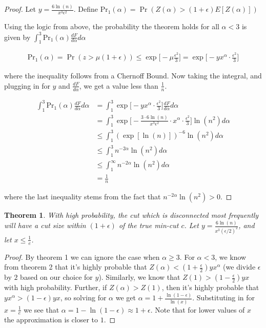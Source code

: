 \documentclass{article}
\newtheorem{theorem}{Theorem}
\begin{document}
\begin{proof}
Let $y = \frac{6 \ln(n)}{x^3 \epsilon^2}$. Define $\text{Pr}_1(\alpha) = \Pr(Z(\alpha) > (1+\epsilon) E[Z(\alpha)])$

Using the logic from above, the probability the theorem holds for all $\alpha < 3$ is given by $\int_{1}^3 \text{Pr}_1(\alpha) \frac{dF}{d \alpha} d\alpha$

\begin{align*}
\text{Pr}_1(\alpha) = \Pr(z > \mu(1 + \epsilon)) \leq \exp \bigg[ -\mu \frac{\epsilon^2}{3}\bigg] = \exp \bigg[-y x^\alpha \cdot \frac{\epsilon^2}{3} \bigg]
\end{align*}

where the inequality follows from a Chernoff Bound. Now taking the integral, and plugging in for $y$ and $\frac{dF}{d \alpha}$, we get a value less than $\frac{1}{n}$.

\begin{align*}
\int_{1}^3 \text{Pr}_1(\alpha) \frac{dF}{d \alpha} d\alpha &= \int_{1}^3 \exp \bigg[-y x^\alpha \cdot \frac{\epsilon^2}{3} \bigg] \frac{dF}{d \alpha} d\alpha \\
&= \int_{1}^{3} \exp \bigg[-\frac{3 \cdot 6 \ln (n)}{x^3 \epsilon^2} \cdot x^\alpha \cdot \frac{\epsilon^2}{3}\bigg] \ln(n^2) d\alpha \\
&\leq \int_{1}^3 (\exp[\ln(n)])^{-6} \ln(n^2) d\alpha \\
&\leq \int_{1}^3 n^{-2 \alpha} \ln(n^2) d\alpha \\
&\leq \int_{1}^\infty n^{-2\alpha} \ln(n^2) d\alpha \\
&= \frac{1}{n}
\end{align*}

where the last inequality stems from the fact that $n^{-2 \alpha} \ln(n^2)  > 0$.

\end{proof}

\begin{theorem}
With high probability, the cut which is disconnected most frequently will have a cut size within $(1+\epsilon)$ of the true min-cut $c$. Let $y = \frac{6 \ln(n)}{x^3 (\epsilon/2)^2}$, and let $x \leq \frac{1}{e}$.
\end{theorem}

\begin{proof}
By theorem 1 we can ignore the case when $\alpha \geq 3$. For $\alpha < 3$, we know from theorem 2 that it's highly probable that $Z(\alpha) < (1+\frac{\epsilon}{2})yx^\alpha$ (we divide $\epsilon$ by $2$ based on our choice for $y$).
Similarly, we know that $Z(1) > (1-\frac{\epsilon}{2}) yx$ with high probability. Further, if $Z(\alpha) > Z(1)$, then it's highly probable that $yx^\alpha > (1-\epsilon) yx$, so solving for $\alpha$ we get $\alpha = 1 + \frac{\ln(1-\epsilon)}{\ln(x)}$. Substituting in for $x = \frac{1}{e}$ we see that $\alpha = 1 - \ln(1 - \epsilon) \approx 1+\epsilon$. Note that for lower values of $x$ the approximation is closer to $1$.
\end{proof}
\end{document}
